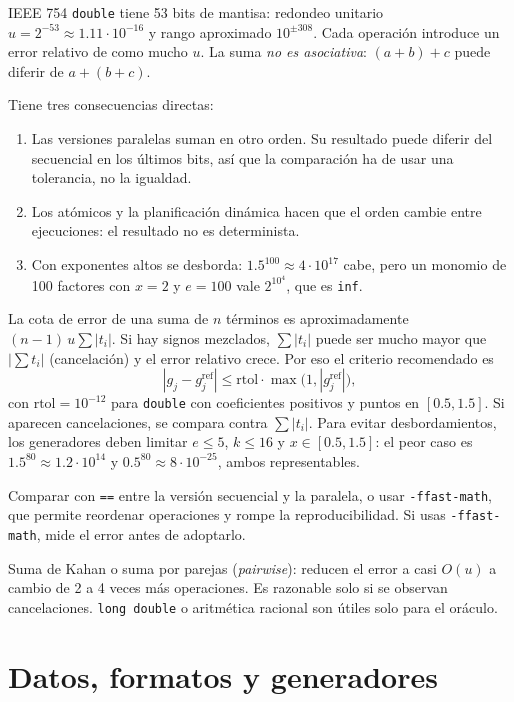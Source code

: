 \que IEEE 754 \texttt{double} tiene 53 bits de mantisa: redondeo unitario $u=2^{-53}\approx1.11\cdot10^{-16}$ y rango aproximado $10^{\pm308}$. Cada operación introduce un error relativo de como mucho $u$. La suma \emph{no es asociativa}: $(a+b)+c$ puede diferir de $a+(b+c)$.

\porque Tiene tres consecuencias directas:
\begin{enumerate}
\item Las versiones paralelas suman en otro orden. Su resultado puede diferir del secuencial en los últimos bits, así que la comparación ha de usar una tolerancia, no la igualdad.
\item Los atómicos y la planificación dinámica hacen que el orden cambie entre ejecuciones: el resultado no es determinista.
\item Con exponentes altos se desborda: $1.5^{100}\approx4\cdot10^{17}$ cabe, pero un monomio de 100 factores con $x=2$ y $e=100$ vale $2^{10^4}$, que es \texttt{inf}.
\end{enumerate}

\como La cota de error de una suma de $n$ términos es aproximadamente $(n-1)\,u\sum|t_i|$. Si hay signos mezclados, $\sum|t_i|$ puede ser mucho mayor que $|\sum t_i|$ (cancelación) y el error relativo crece. Por eso el criterio recomendado es
\[
|g_j-g_j^{\text{ref}}|\le \text{rtol}\cdot\max\!\big(1,|g_j^{\text{ref}}|\big),
\]
con $\text{rtol}=10^{-12}$ para \texttt{double} con coeficientes positivos y puntos en $[0.5,1.5]$. Si aparecen cancelaciones, se compara contra $\sum|t_i|$. Para evitar desbordamientos, los generadores deben limitar $e\le5$, $k\le16$ y $x\in[0.5,1.5]$: el peor caso es $1.5^{80}\approx1.2\cdot10^{14}$ y $0.5^{80}\approx8\cdot10^{-25}$, ambos representables.

\begin{trampa}
Comparar con \texttt{==} entre la versión secuencial y la paralela, o usar \texttt{-ffast-math}, que permite reordenar operaciones y rompe la reproducibilidad. Si usas \texttt{-ffast-math}, mide el error antes de adoptarlo.
\end{trampa}

\alt Suma de Kahan o suma por parejas (\emph{pairwise}): reducen el error a casi $O(u)$ a cambio de 2 a 4 veces más operaciones. Es razonable solo si se observan cancelaciones. \texttt{long double} o aritmética racional son útiles solo para el oráculo.

\section{Datos, formatos y generadores}\label{tema:datos}

